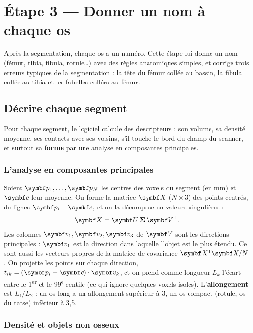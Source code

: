 \chapter{Étape 3 — Donner un nom à chaque os}
\label{chap:identification}

\begin{chapeau}
Après la segmentation, chaque os a un numéro. Cette étape lui donne un nom (fémur, tibia, fibula, rotule\ldots) avec
des règles anatomiques simples, et corrige trois erreurs typiques de la segmentation : la tête du fémur collée au
bassin, la fibula collée au tibia et les fabelles collées au fémur.
\end{chapeau}

\section{Décrire chaque segment}

Pour chaque segment, le logiciel calcule des descripteurs : son volume, sa densité moyenne, ses contacts avec ses
voisins, s'il touche le bord du champ du scanner, et surtout sa \textbf{forme} par une analyse en composantes
principales.

\subsection{L'analyse en composantes principales}
\label{sec:acp}

Soient $\vb{p}_1, \ldots, \vb{p}_N$ les centres des voxels du segment (en mm) et $\vb{c}$ leur moyenne. On forme la
matrice $\mt{X}$ ($N \times 3$) des points centrés, de lignes $\vb{p}_i - \vb{c}$, et on la décompose en valeurs
singulières :
\begin{equation}
  \mt{X} = \mt{U}\,\boldsymbol{\Sigma}\,\mt{V}^{\mathsf T}.
\end{equation}
Les colonnes $\vb{v}_1, \vb{v}_2, \vb{v}_3$ de $\mt{V}$ sont les directions principales : $\vb{v}_1$ est la
direction dans laquelle l'objet est le plus étendu. Ce sont aussi les vecteurs propres de la matrice de covariance
$\mt{X}^{\mathsf T}\mt{X}/N$. On projette les points sur chaque direction, $t_{ik} = (\vb{p}_i - \vb{c})\cdot\vb{v}_k$,
et on prend comme longueur $L_k$ l'écart entre le 1\textsuperscript{er} et le 99\textsuperscript{e} centile (ce qui
ignore quelques voxels isolés). L'\textbf{allongement} est $L_1 / L_2$ : un os long a un allongement supérieur à 3,
un os compact (rotule, os du tarse) inférieur à 3,5.

\subsection{Densité et objets non osseux}

